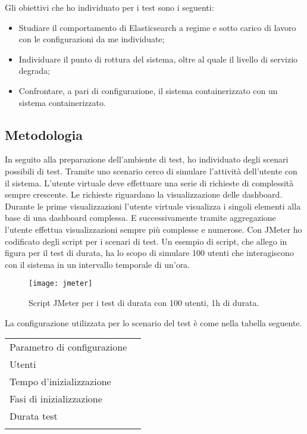 Gli obiettivi che ho individuato per i test sono i seguenti:

\begin{itemize}
	\item Studiare il comportamento di Elasticsearch a regime e 
	      sotto carico di lavoro con le configurazioni da me individuate;      
	\item Individuare il punto di rottura del sistema, oltre al quale  
	      il livello di servizio degrada;
	\item Confrontare, a pari di configurazione, il sistema containerizzato 
		  con un sistema containerizzato.
\end{itemize}

\subsection{Metodologia}

In seguito alla preparazione dell'ambiente di test, 
ho individuato degli scenari possibili di test. 
Tramite uno scenario cerco di simulare l'attività 
dell'utente con il sistema. L'utente virtuale deve 
effettuare una serie di richieste di complessità sempre
crescente. Le richieste riguardano la visualizzazione 
delle dashboard. Durante le prime visualizzazioni
l'utente virtuale visualizza i singoli elementi 
alla base di una dashboard complessa. E successivamente 
tramite aggregazione l'utente effettua visualizzazioni
sempre più complesse e numerose.
Con JMeter ho codificato degli script per i scenari di test. 
Un esempio di script, che allego in figura per il test di durata, 
ha lo scopo di simulare 100 utenti che interagiscono con il sistema 
in un intervallo temporale di un'ora. 

\begin{figure}[htbp]
	\begin{center}
		\texttt{[image: jmeter]}
		\caption{Script JMeter per i test di durata con 100 utenti, 1h di durata.}
	\end{center}
\end{figure} 

La configurazione utilizzata per lo scenario del test 
è come nella tabella seguente.

\begin{center}
	\begin{tabular}
		{l||p{5cm}}	
		\arrayrulecolor{white}
		\rowcolor{glaucous}	
		Parametro di configurazione &  
		\makebox[5cm][c]{Valore) } \\
		\rowcolor{lightcornflowerblue}
		Utenti & 
		\makebox[5cm][c]{100} \\
		\rowcolor{moonstoneblue}
		Tempo d'inizializzazione & 
		\makebox[5cm][c]{20 minuti} \\
		\rowcolor{lightcornflowerblue}
		Fasi di inizializzazione & 
		\makebox[5cm][c]{10}  \\
		\rowcolor{moonstoneblue}
		Durata test & 
		\makebox[5cm][c]{60 minuti}\\ 
		\rowcolor{lightcornflowerblue}
	\end{tabular}		  
\end{center}

